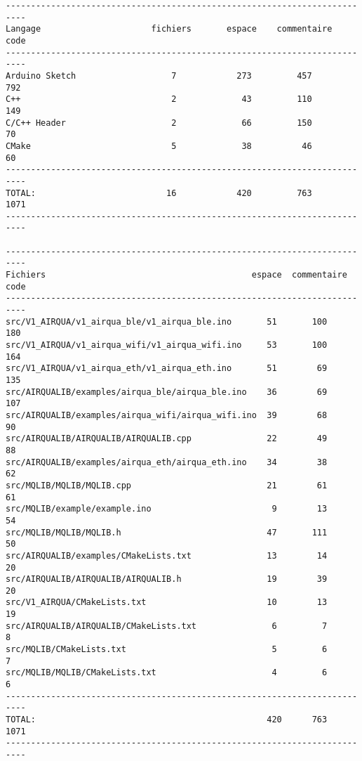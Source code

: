 \begin{verbatim}
--------------------------------------------------------------------------
Langage                      fichiers       espace    commentaire     code
--------------------------------------------------------------------------
Arduino Sketch                   7            273         457          792
C++                              2             43         110          149
C/C++ Header                     2             66         150           70
CMake                            5             38          46           60
--------------------------------------------------------------------------
TOTAL:                          16            420         763         1071
--------------------------------------------------------------------------

--------------------------------------------------------------------------
Fichiers                                       	 espace  commentaire  code
--------------------------------------------------------------------------
src/V1_AIRQUA/v1_airqua_ble/v1_airqua_ble.ino       51       100       180
src/V1_AIRQUA/v1_airqua_wifi/v1_airqua_wifi.ino     53       100       164
src/V1_AIRQUA/v1_airqua_eth/v1_airqua_eth.ino       51        69       135
src/AIRQUALIB/examples/airqua_ble/airqua_ble.ino    36        69       107
src/AIRQUALIB/examples/airqua_wifi/airqua_wifi.ino  39        68        90
src/AIRQUALIB/AIRQUALIB/AIRQUALIB.cpp               22        49        88
src/AIRQUALIB/examples/airqua_eth/airqua_eth.ino    34        38        62
src/MQLIB/MQLIB/MQLIB.cpp                           21        61        61
src/MQLIB/example/example.ino                        9        13        54
src/MQLIB/MQLIB/MQLIB.h                             47       111        50
src/AIRQUALIB/examples/CMakeLists.txt               13        14        20
src/AIRQUALIB/AIRQUALIB/AIRQUALIB.h                 19        39        20
src/V1_AIRQUA/CMakeLists.txt                        10        13        19
src/AIRQUALIB/AIRQUALIB/CMakeLists.txt               6         7         8
src/MQLIB/CMakeLists.txt                             5         6         7
src/MQLIB/MQLIB/CMakeLists.txt                       4         6         6
--------------------------------------------------------------------------
TOTAL:                                              420      763      1071
--------------------------------------------------------------------------

\end{verbatim}



